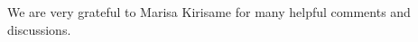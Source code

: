 \documentclass[acmsmall,10pt,screen]{acmart}
\begin{document}




\begin{acks}

We are very grateful to Marisa Kirisame for many helpful comments and discussions.

\end{acks}


\end{document}
